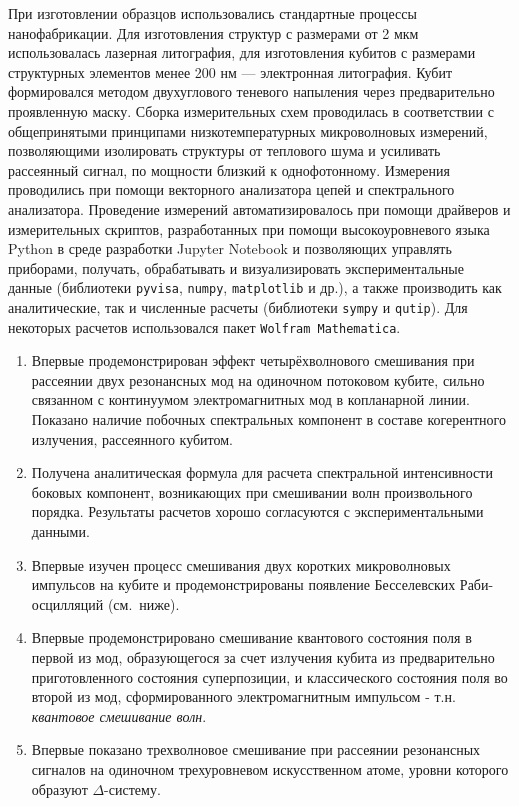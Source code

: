 {\methods} При изготовлении образцов использовались стандартные процессы нанофабрикации. Для изготовления структур с размерами от 2 мкм использовалась лазерная литография, для изготовления кубитов с размерами структурных элементов менее 200 нм --- электронная литография. Кубит формировался методом двухуглового теневого напыления через предварительно проявленную маску. Сборка измерительных схем проводилась в соответствии с общепринятыми принципами низкотемпературных микроволновых измерений, позволяющими изолировать структуры от теплового шума и усиливать рассеянный сигнал, по мощности близкий к однофотонному. Измерения проводились при помощи векторного анализатора цепей и спектрального анализатора. 
Проведение измерений автоматизировалось при помощи драйверов и измерительных скриптов, разработанных при помощи высокоуровневого языка Python в среде разработки Jupyter Notebook и позволяющих управлять приборами, получать, обрабатывать и визуализировать экспериментальные данные (библиотеки \verb|pyvisa|, \verb|numpy|, \verb|matplotlib| и др.), а также производить как аналитические, так и численные расчеты (библиотеки \verb|sympy| и \verb|qutip|). Для некоторых расчетов использовался пакет \verb|Wolfram Mathematica|.

{\novelty}
\begin{enumerate}
  \item Впервые продемонстрирован эффект четырёхволнового смешивания при рассеянии двух резонансных мод на одиночном потоковом кубите, сильно связанном с континуумом электромагнитных мод в копланарной линии. Показано наличие побочных спектральных компонент в составе когерентного излучения, рассеянного кубитом. 
  \item Получена аналитическая формула для расчета спектральной интенсивности боковых компонент, возникающих при смешивании волн произвольного порядка. Результаты расчетов хорошо согласуются с экспериментальными данными. 
  \item Впервые изучен процесс смешивания двух коротких микроволновых импульсов на кубите и продемонстрированы  появление Бесселевских Раби-осцилляций (см.~ниже).
  \item Впервые продемонстрировано смешивание квантового состояния поля в первой из мод, образующегося за счет излучения кубита из предварительно приготовленного состояния суперпозиции, и классического состояния поля во второй из мод, сформированного электромагнитным импульсом - т.н. \textit{квантовое смешивание волн}.
  \item Впервые показано трехволновое смешивание при рассеянии резонансных сигналов на одиночном трехуровневом искусственном атоме, уровни которого образуют $\Delta$-систему.
\end{enumerate}

